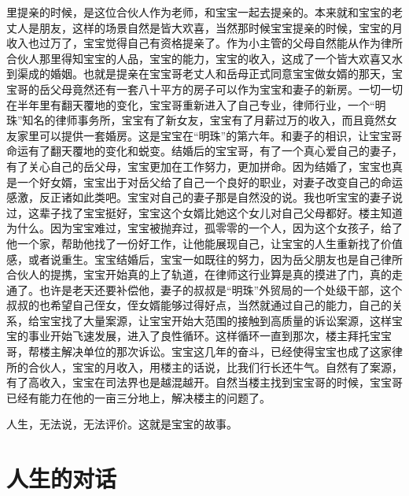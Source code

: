 里提亲的时候，是这位合伙人作为老师，和宝宝一起去提亲的。本来就和宝宝的老丈人是朋友，这样的场景自然是皆大欢喜，当然那时候宝宝提亲的时候，宝宝的月收入也过万了，宝宝觉得自己有资格提亲了。作为小主管的父母自然能从作为律所合伙人那里得知宝宝的人品，宝宝的能力，宝宝的收入，这成了一个皆大欢喜又水到渠成的婚姻。也就是提亲在宝宝哥老丈人和岳母正式同意宝宝做女婿的那天，宝宝哥的岳父母竟然还有一套八十平方的房子可以作为宝宝和妻子的新房。一切一切在半年里有翻天覆地的变化，宝宝哥重新进入了自己专业，律师行业，一个“明珠”知名的律师事务所，宝宝有了新女友，宝宝有了月薪过万的收入，而且竟然女友家里可以提供一套婚房。这是宝宝在“明珠”的第六年。和妻子的相识，让宝宝哥命运有了翻天覆地的变化和蜕变。结婚后的宝宝哥，有了一个真心爱自己的妻子，有了关心自己的岳父母，宝宝更加在工作努力，更加拼命。因为结婚了，宝宝也真是一个好女婿，宝宝出于对岳父给了自己一个良好的职业，对妻子改变自己的命运感激，反正诸如此类吧。宝宝对自己的妻子那是自然没的说。我也听宝宝的妻子说过，这辈子找了宝宝挺好，宝宝这个女婿比她这个女儿对自己父母都好。楼主知道为什么。因为宝宝难过，宝宝被抛弃过，孤零零的一个人，因为这个女孩子，给了他一个家，帮助他找了一份好工作，让他能展现自己，让宝宝的人生重新找了价值感，或者说重生。宝宝结婚后，宝宝一如既往的努力，因为岳父朋友也是自己律所合伙人的提携，宝宝开始真的上了轨道，在律师这行业算是真的摸进了门，真的走通了。也许是老天还要补偿他，妻子的叔叔是“明珠”外贸局的一个处级干部，这个叔叔的也希望自己侄女，侄女婿能够过得好点，当然就通过自己的能力，自己的关系，给宝宝找了大量案源，让宝宝开始大范围的接触到高质量的诉讼案源，这样宝宝的事业开始飞速发展，进入了良性循环。这样循环一直到那次，楼主拜托宝宝哥，帮楼主解决单位的那次诉讼。宝宝这几年的奋斗，已经使得宝宝也成了这家律所的合伙人，宝宝的月收入，用楼主的话说，比我们行长还牛气。自然有了案源，有了高收入，宝宝在司法界也是越混越开。自然当楼主找到宝宝哥的时候，宝宝哥已经有能力在他的一亩三分地上，解决楼主的问题了。

人生，无法说，无法评价。这就是宝宝的故事。

\section{人生的对话}

 

